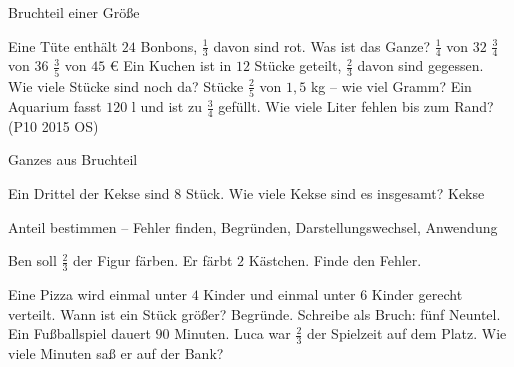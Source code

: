 \begin{aufgabe}{Bruchteil einer Größe}
\begin{teile}
\teil Eine Tüte enthält $24$ Bonbons, $\frac{1}{3}$ davon sind rot. Was ist das Ganze?
\teil $\frac{1}{4}$ von $32$
\teil $\frac{3}{4}$ von $36$
\teil $\frac{3}{5}$ von $45$ € \leerfeld[€]
\teil Ein Kuchen ist in $12$ Stücke geteilt, $\frac{2}{3}$ davon sind gegessen. Wie viele Stücke sind noch da? \leerfeld Stücke
\teil $\frac{2}{5}$ von $1{,}5$ kg – wie viel Gramm? \leerfeld[g]
\teil Ein Aquarium fasst $120$ l und ist zu $\frac{3}{4}$ gefüllt. Wie viele Liter fehlen bis zum Rand? \hfill (P10 2015 OS) \\ \leerfeld[l]
\end{teile}
\end{aufgabe}

\begin{aufgabe}{Ganzes aus Bruchteil}
\begin{teile}
\teil Ein Drittel der Kekse sind $8$ Stück. Wie viele Kekse sind es insgesamt? \leerfeld Kekse
\end{teile}
\end{aufgabe}

\begin{aufgabe}{Anteil bestimmen – Fehler finden, Begründen, Darstellungswechsel, Anwendung}
\begin{teile}
\teil Ben soll $\frac{2}{3}$ der Figur färben. Er färbt $2$ Kästchen. Finde den Fehler.

\teil Eine Pizza wird einmal unter $4$ Kinder und einmal unter $6$ Kinder gerecht verteilt. Wann ist ein Stück größer? Begründe.
\teil Schreibe als Bruch: fünf Neuntel. \leerfeld
\teil Ein Fußballspiel dauert $90$ Minuten. Luca war $\frac{2}{3}$ der Spielzeit auf dem Platz. Wie viele Minuten saß er auf der Bank? \leerfeld[min]
\end{teile}
\end{aufgabe}
